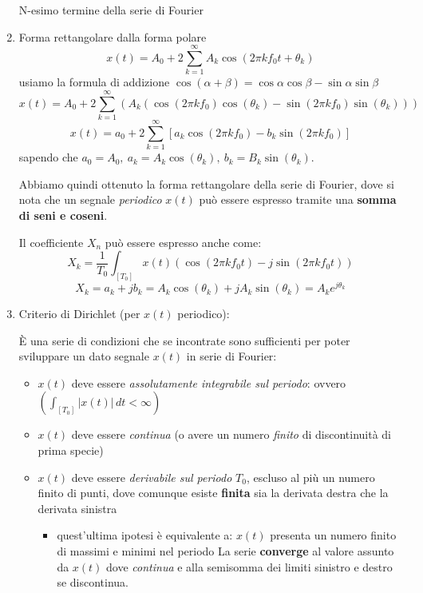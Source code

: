 \documentclass[
]{article}
\providecommand{\tightlist}{%
  \setlength{\itemsep}{0pt}\setlength{\parskip}{0pt}}
\begin{document}
\begin{enumerate}
  N-esimo termine della serie di Fourier
\item
  Forma rettangolare dalla forma polare \[
   x(t) = A_{0} + 2 \sum_{k=1}^{\infty} A_{k} \cos(2\pi k f_{0}t + \theta_{k})
   \] usiamo la formula di addizione
  \(\cos(\alpha + \beta) = \cos\alpha\cos\beta - \sin\alpha\sin\beta\)
  \[
   x(t) = A_{0} + 2 \sum_{k=1}^{\infty} (A_{k}(\cos(2\pi k f_{0})\cos({\theta_k}) - \sin(2\pi k f_{0})\sin({\theta_k})))
   \] \[
   x(t) = a_{0} + 2 \sum_{k=1}^{\infty} [a_{k} \cos(2\pi k f_{0}) - b_{k}\sin(2\pi k f_{0})]
   \] sapendo che
  \(a_{0} = A_{0}, \ a_{k} = A_{k}\cos(\theta_k), \ b_{k} = B_{k}\sin(\theta_k)\).

  Abbiamo quindi ottenuto la forma rettangolare della serie di Fourier,
  dove si nota che un segnale \emph{periodico} \(x(t)\) può essere
  espresso tramite una \textbf{somma di seni e coseni}.

  Il coefficiente \(X_n\) può essere espresso anche come: \[
   X_k = \frac{1}{T_0} \int_{[T_0]} x(t) (\cos(2\pi kf_{0}t) - j\sin(2\pi kf_{0}t))
   \] \[
   X_k = a_k +jb_k = A_k \cos(\theta_k) + jA_k\sin(\theta_k) = A_k e^{j\theta_k}
   \]
\item
  Criterio di Dirichlet (per \(x(t)\) periodico):

  È una serie di condizioni che se incontrate sono sufficienti per poter
  sviluppare un dato segnale \(x(t)\) in serie di Fourier:

  \begin{itemize}
  \tightlist
  \item
    \(x(t)\) deve essere \emph{assolutamente integrabile sul periodo}:
    ovvero \((\int_{[T_0]}|x(t)| \,dt < \infty)\)
  \item
    \(x(t)\) deve essere \emph{continua} (o avere un numero
    \emph{finito} di discontinuità di prima specie)
  \item
    \(x(t)\) deve essere \emph{derivabile sul periodo} \(T_0\), escluso
    al più un numero finito di punti, dove comunque esiste
    \textbf{finita} sia la derivata destra che la derivata sinistra

    \begin{itemize}
    \tightlist
    \item
      quest'ultima ipotesi è equivalente a: \(x(t)\) presenta un numero
      finito di massimi e minimi nel periodo La serie \textbf{converge}
      al valore assunto da \(x(t)\) dove \emph{continua} e alla
      semisomma dei limiti sinistro e destro se discontinua.
    \end{itemize}
  \end{itemize}
\end{enumerate}
\end{document}
